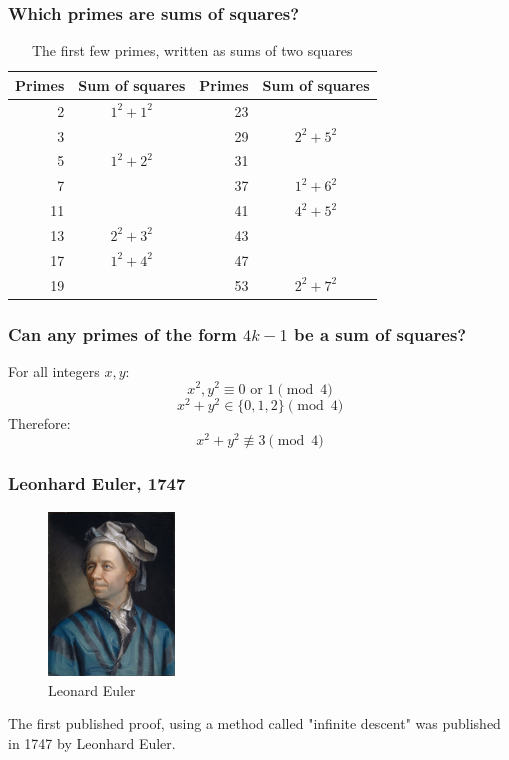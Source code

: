 \documentclass{beamer}
\begin{document}
\begin{frame}
	\frametitle{Which primes are sums of squares?}

	\begin{table}
\begin{tabular}{| r | c || r | c |}
	\hline 
	Primes & Sum of squares & Primes & Sum of squares \\
	\hline 
	2 & $1^2 + 1^2$ & 23 & \textcolor{red}{\textbf{\textemdash}} \\
	3 & \textcolor{red}{\textbf{\textemdash}} & 29 & $2^2 + 5^2$ \\
	5 & $1^2 + 2^2$ & 31 & \textcolor{red}{\textbf{\textemdash}} \\
	7 &  \textcolor{red}{\textbf{\textemdash}} & 37 & $1^2 + 6^2$ \\
	11 &  \textcolor{red}{\textbf{\textemdash}} & 41 & $4^2 + 5^2$ \\
	13 &  $2^2+3^2$ & 43 & \textcolor{red}{\textbf{\textemdash}} \\
	17 &  $1^2 + 4^2$ & 47 & \textcolor{red}{\textbf{\textemdash}} \\
	19 & \textcolor{red}{\textbf{\textemdash}} & 53 & $2^2 + 7^2$ \\
\hline
\end{tabular}
\caption*{The first few primes, written as sums of two squares}
\end{table}

\end{frame}

\begin{frame}
	\frametitle{Can any primes of the form $4k-1$ be a sum of squares?}

	For all integers $x,y$:
	\[ x^2, y^2 \equiv 0 \text{ or } 1 \pmod{4} \]
	\[ x^2 + y^2 \in \{0, 1, 2\} \pmod{4} \]
	Therefore:
	\[ x^2 + y^2 \not \equiv 3 \pmod{4} \]
\end{frame}


\begin{frame}
	\frametitle{Leonhard Euler, 1747}
	\begin{figure}
		\includegraphics[width=0.3\textwidth]{594px-Leonhard_Euler.jpg}
        	\caption*{Leonard Euler}
        	\label{fig:euler1}
	\end{figure}

	The first published proof, using a method called "infinite descent" was
	published in 1747 by Leonhard Euler.
\end{frame}
\end{document}
